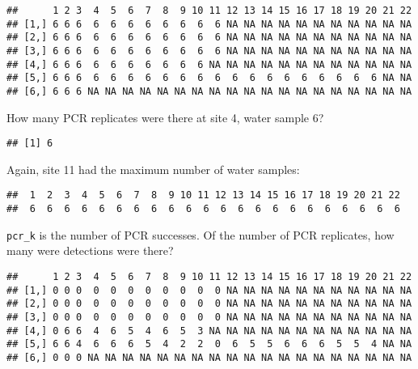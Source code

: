 \documentclass[
]{article}
\newenvironment{Shaded}{\begin{snugshade}}{\end{snugshade}}
\newcommand{\DecValTok}[1]{\textcolor[rgb]{0.00,0.00,0.81}{#1}}
\newcommand{\FunctionTok}[1]{\textcolor[rgb]{0.13,0.29,0.53}{\textbf{#1}}}
\newcommand{\NormalTok}[1]{#1}
\newcommand{\SpecialCharTok}[1]{\textcolor[rgb]{0.81,0.36,0.00}{\textbf{#1}}}
\begin{document}
\begin{verbatim}
##      1 2 3  4  5  6  7  8  9 10 11 12 13 14 15 16 17 18 19 20 21 22
## [1,] 6 6 6  6  6  6  6  6  6  6  6 NA NA NA NA NA NA NA NA NA NA NA
## [2,] 6 6 6  6  6  6  6  6  6  6  6 NA NA NA NA NA NA NA NA NA NA NA
## [3,] 6 6 6  6  6  6  6  6  6  6  6 NA NA NA NA NA NA NA NA NA NA NA
## [4,] 6 6 6  6  6  6  6  6  6  6 NA NA NA NA NA NA NA NA NA NA NA NA
## [5,] 6 6 6  6  6  6  6  6  6  6  6  6  6  6  6  6  6  6  6  6 NA NA
## [6,] 6 6 6 NA NA NA NA NA NA NA NA NA NA NA NA NA NA NA NA NA NA NA
\end{verbatim}

How many PCR replicates were there at site 4, water sample 6?

\begin{Shaded}
\end{Shaded}

\begin{verbatim}
## [1] 6
\end{verbatim}

Again, site 11 had the maximum number of water samples:

\begin{Shaded}
\end{Shaded}

\begin{verbatim}
##  1  2  3  4  5  6  7  8  9 10 11 12 13 14 15 16 17 18 19 20 21 22 
##  6  6  6  6  6  6  6  6  6  6  6  6  6  6  6  6  6  6  6  6  6  6
\end{verbatim}

\texttt{pcr\_k} is the number of PCR successes. Of the number of PCR
replicates, how many were detections were there?

\begin{Shaded}
\end{Shaded}

\begin{verbatim}
##      1 2 3  4  5  6  7  8  9 10 11 12 13 14 15 16 17 18 19 20 21 22
## [1,] 0 0 0  0  0  0  0  0  0  0  0 NA NA NA NA NA NA NA NA NA NA NA
## [2,] 0 0 0  0  0  0  0  0  0  0  0 NA NA NA NA NA NA NA NA NA NA NA
## [3,] 0 0 0  0  0  0  0  0  0  0  0 NA NA NA NA NA NA NA NA NA NA NA
## [4,] 0 6 6  4  6  5  4  6  5  3 NA NA NA NA NA NA NA NA NA NA NA NA
## [5,] 6 6 4  6  6  6  5  4  2  2  0  6  5  5  6  6  6  5  5  4 NA NA
## [6,] 0 0 0 NA NA NA NA NA NA NA NA NA NA NA NA NA NA NA NA NA NA NA
\end{verbatim}
\end{document}
